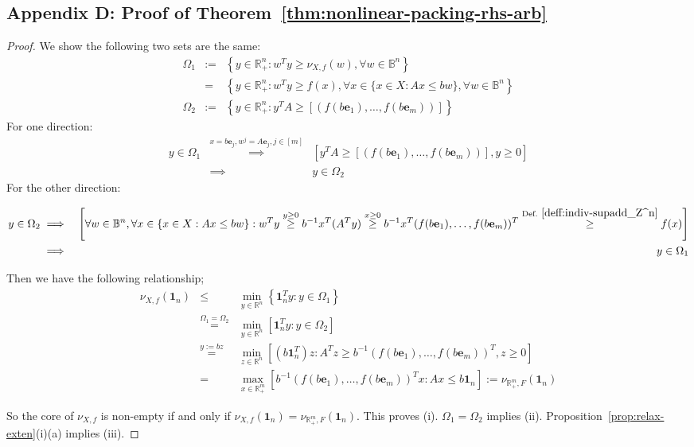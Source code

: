 \documentclass[11pt]{article}\usepackage[]{graphicx}\usepackage[]{xcolor}
\begin{document}
\subsection{Appendix D: Proof of Theorem~\ref{thm:nonlinear-packing-rhs-arb}}
\begin{proof}
We show the following two sets are the same:
\begin{eqnarray*}
\Omega_1&:=&\left\{y\in\mathbb{R}^n_{+}: w^Ty\ge \nu_{X, f}(w), \forall w\in \mathbb{B}^n\right\}\\
&=&\left\{y\in\mathbb{R}^n_{+}: w^Ty\ge f(x), \forall x\in \{x\in X: Ax\le bw\}, \forall w\in \mathbb{B}^n\right\}\\
\Omega_2&:=&\left\{y\in\mathbb{R}^n_{+}: y^TA\ge [(f(b\mathbf{e}_1) ,\dots, f(b\mathbf{e}_m))]\right\}
\end{eqnarray*}
For one direction:
\begin{eqnarray*}
y\in \Omega_1&\overset{x=b\mathbf{e}_j, w^j=A\mathbf{e}_j, j\in [m]}{\implies}& \left[y^TA\ge [(f(b\mathbf{e}_1),\dots, f(b\mathbf{e}_m))], y\ge 0 \right]\\
&\implies& y\in \Omega_2
\end{eqnarray*}
For the other direction: 
\begin{small}
\begin{eqnarray*}
y\in \Omega_2&\implies& \left[\forall w\in \mathbb{B}^n, \forall x\in \{x\in X: Ax\le bw\}: w^Ty\overset{y\ge 0}{\ge} b^{-1} x^T(A^Ty)\overset{x\ge 0}{\ge} b^{-1} x^T(f(b\mathbf{e}_1),\dots, f(b\mathbf{e}_m))^T \overset{\text{Def.}~\ref{deff:indiv-supadd_Z^n}}{\ge} f(x)\right]\\
&\implies& y\in \Omega_1
\end{eqnarray*}
\end{small}

Then we have the following relationship;
\begin{eqnarray*}
\nonumber \nu_{X, f}\left(\mathbf{1}_n\right)&\le&\min\limits_{y\in\mathbb{R}^{n}}\left\{\mathbf{1}_n^Ty: y\in\Omega_1\right\}\\
&\overset{\Omega_1=\Omega_2}{=}&\min\limits_{y\in\mathbb{R}^{n}} \left[\mathbf{1}_n^Ty: y\in\Omega_2\right]\\
\nonumber&\overset{y:=bz}{=}&\min\limits_{z\in\mathbb{R}^{n}}\left[\left(b\mathbf{1}_n^T\right)z: A^Tz\ge b^{-1}(f(b\mathbf{e}_1),\dots, f(b\mathbf{e}_m))^T, z\ge 0\right]\\
\nonumber&=&\max\limits_{x\in \mathbb{R}^m_{+}} \left[b^{-1}(f(b\mathbf{e}_1),\dots, f(b\mathbf{e}_m))^Tx: Ax\le b\mathbf{1}_n\right]:=\nu_{\mathbb{R}^m_{+}, F}\left(\mathbf{1}_n\right)
\end{eqnarray*}


So the core of $\nu_{X, f}$ is non-empty if and only if $\nu_{X, f}\left(\mathbf{1}_n\right)=\nu_{\mathbb{R}^m_{+}, F}\left(\mathbf{1}_n\right)$.  This proves (i). $\Omega_1=\Omega_2$ implies (ii). Proposition~\ref{prop:relax-exten}(i)(a) implies (iii).


\end{proof}
\end{document}
